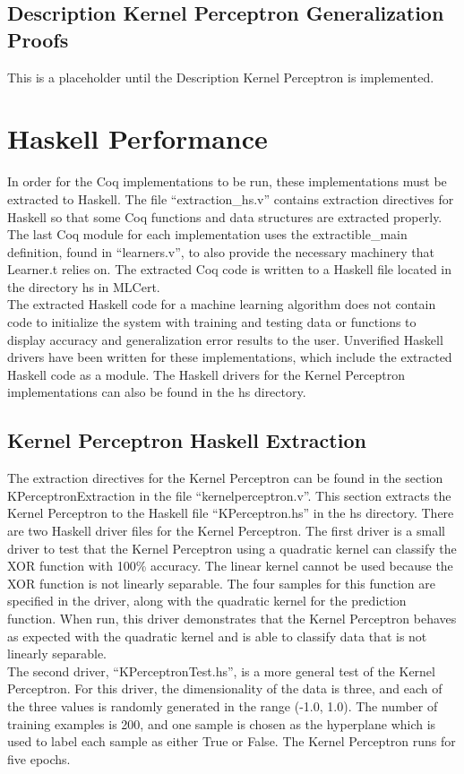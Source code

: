 \subsection{Description Kernel Perceptron Generalization Proofs}\label{KPDProofs}
This is a placeholder until the Description Kernel Perceptron is implemented.
\section{Haskell Performance}\label{HaskellExtraction}
In order for the Coq implementations to be run, these implementations must be extracted to Haskell. The file ``extraction\_hs.v'' contains extraction directives for Haskell so that some Coq functions and data structures are extracted properly. The last Coq module for each implementation uses the extractible\_main definition, found in ``learners.v'', to also provide the necessary machinery that Learner.t relies on. The extracted Coq code is written to a Haskell file located in the directory hs in MLCert.
\\The extracted Haskell code for a machine learning algorithm does not contain code to initialize the system with training and testing data or functions to display accuracy and generalization error results to the user. Unverified Haskell drivers have been written for these implementations, which include the extracted Haskell code as a module. The Haskell drivers for the Kernel Perceptron implementations can also be found in the hs directory.
\subsection{Kernel Perceptron Haskell Extraction}\label{KPHaskell}
The extraction directives for the Kernel Perceptron can be found in the section KPerceptronExtraction in the file ``kernelperceptron.v''. This section extracts the Kernel Perceptron to the Haskell file ``KPerceptron.hs'' in the hs directory. There are two Haskell driver files for the Kernel Perceptron. The first driver is a small driver to test that the Kernel Perceptron using a quadratic kernel can classify the XOR function with 100\% accuracy. The linear kernel cannot be used because the XOR function is not linearly separable. The four samples for this function are specified in the driver, along with the quadratic kernel for the prediction function. When run, this driver demonstrates that the Kernel Perceptron behaves as expected with the quadratic kernel and is able to classify data that is not linearly separable.
\\The second driver, ``KPerceptronTest.hs'', is a more general test of the Kernel Perceptron. For this driver, the dimensionality of the data is three, and each of the three values is randomly generated in the range (-1.0, 1.0). The number of training examples is 200, and one sample is chosen as the hyperplane which is used to label each sample as either True or False. The Kernel Perceptron runs for five epochs.
